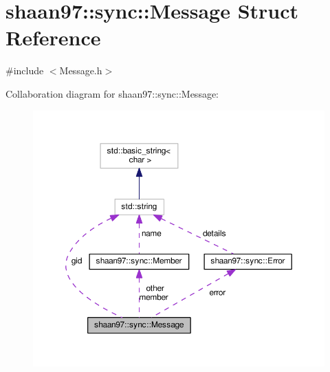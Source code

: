 \hypertarget{structshaan97_1_1sync_1_1_message}{}\section{shaan97\+:\+:sync\+:\+:Message Struct Reference}
\label{structshaan97_1_1sync_1_1_message}


{\ttfamily \#include $<$Message.\+h$>$}



Collaboration diagram for shaan97\+:\+:sync\+:\+:Message\+:
\nopagebreak
\begin{figure}[H]
\begin{center}
\leavevmode
\includegraphics[width=350pt]{structshaan97_1_1sync_1_1_message__coll__graph}
\end{center}
\end{figure}
